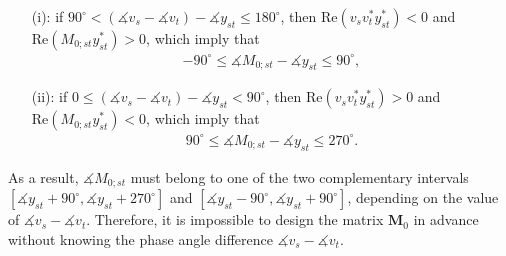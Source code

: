\documentclass[journal,twoside]{IEEEtran}
\newcommand{\bM}{\mathbf{M}}
\begin{document}
\begin{itemize}
\item[(i):] if $90^{\circ}<(\measuredangle v_{s}-\measuredangle v_{t})-\measuredangle y_{st}\leq  180^{\circ}$, then $\mathrm{Re}(v_sv^{\ast}_t y^{\ast}_{st})<0$
and  $\mathrm{Re}(M_{0;st}y^{\ast}_{st})>0$, which imply that
\begin{align}
-90^{\circ} \leq \measuredangle M_{0;st}-\measuredangle y_{st}\leq  90^{\circ},
\end{align}
\item[(ii):] if $0 \leq (\measuredangle v_{s}-\measuredangle v_{t})-\measuredangle y_{st} < 90^{\circ} $, then $\mathrm{Re}(v_sv^{\ast}_t y^{\ast}_{st})>0$
and  $\mathrm{Re}(M_{0;st}y^{\ast}_{st})<0$, which imply that
\begin{align}
90^{\circ} \leq \measuredangle M_{0;st}-\measuredangle y_{st} \leq 270^{\circ}.
\end{align}
\end{itemize}
As a result,  $\measuredangle M_{0;st}$ must belong to one of the two complementary intervals
$[\measuredangle y_{st}+90^{\circ}, \measuredangle y_{st}+270^{\circ}]$ and $[\measuredangle y_{st}-90^{\circ}, \measuredangle y_{st}+90^{\circ}]$,
depending on the value of $\measuredangle v_{s}-\measuredangle v_{t}$. Therefore, it is impossible to design the matrix $\bM_{0}$ in advance
without knowing the phase angle difference $\measuredangle v_{s}-\measuredangle v_{t}$.
\end{document}
